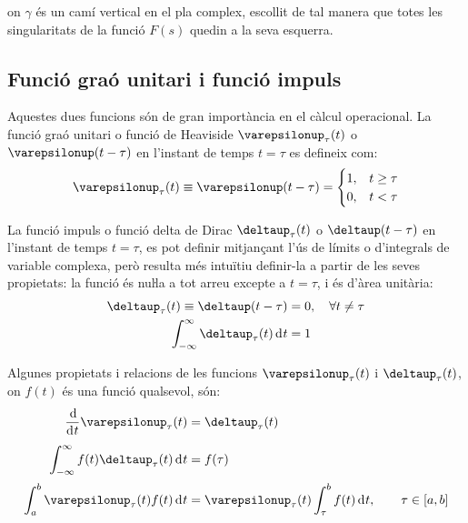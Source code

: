 on $\gamma$ és un camí vertical en el pla complex, escollit de tal
manera que totes les singularitats de la funció $F(s)$ quedin a la
seva esquerra.

\subsection{Funció graó unitari i funció impuls} 

Aquestes dues funcions són de gran importància en el càlcul
operacional. La funció graó unitari o funció de Heaviside
$\varepsilonup_\tau(t)$ o $\varepsilonup(t-\tau)$ en l'instant de temps
$t=\tau$ es defineix com:
\begin{equation}
    \varepsilonup_\tau(t) \equiv \varepsilonup(t-\tau) = \begin{cases} 1, & t \geq \tau \\ 0, & t < \tau \end{cases}
\end{equation}

La funció impuls o funció delta de Dirac $\deltaup_\tau(t)$ o
$\deltaup(t-\tau)$ en l'instant de temps $t=\tau$, es pot definir
mitjançant l'ús de límits o d'integrals de variable complexa, però
resulta més intuïtiu definir-la a partir de les seves propietats: la
funció és nuŀla a tot arreu excepte a $t=\tau$, i és d'àrea
unitària:
\begin{subequations}
\begin{align}
    \deltaup_\tau(t) \equiv \deltaup(t-\tau) &= 0, \quad \forall t \neq \tau \\
    \int_{-\infty}^\infty \deltaup_\tau(t) \diff t &= 1
\end{align}
\end{subequations}

Algunes propietats i relacions de les funcions $\varepsilonup_\tau(t)$ i $\deltaup_\tau(t)$, on $f(t)$ és una funció qualsevol, són:
\begin{align}
   \frac{\diff}{\diff t} \varepsilonup_\tau (t) &= \deltaup_\tau(t) \\[0.5ex]
   \int_{-\infty}^\infty f(t) \deltaup_\tau (t) \diff t &= f(\tau) \\[0.5ex]
    \int_a^b \varepsilonup_\tau (t) f(t) \diff t &= \varepsilonup_\tau(t)
    \int_\tau^b f(t) \diff t, \qquad \tau \in [a, b]
\end{align}



